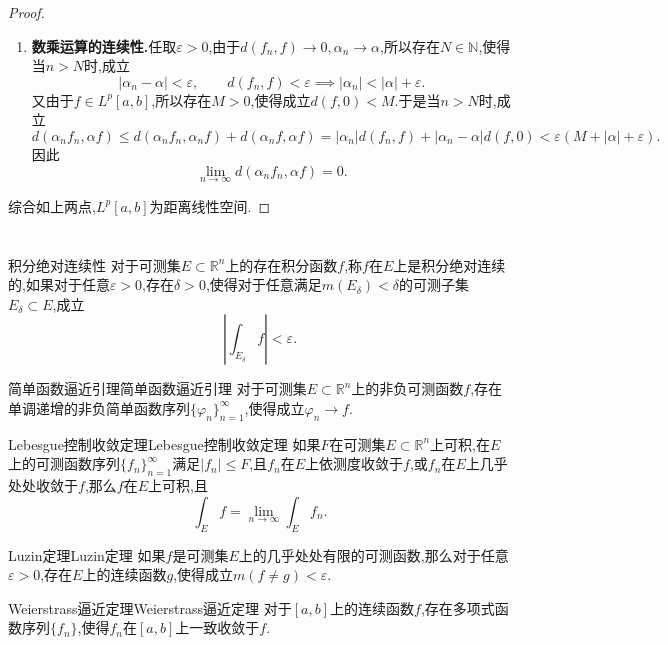 \documentclass[lang = cn, scheme = chinese]{elegantbook}
\newcommand{\R}{\mathbb{R}}            %
\begin{document}
\begin{proof}
\begin{enumerate}
			\item {\bf 数乘运算的连续性.}任取$\varepsilon>0$,由于$d(f_n,f)\to 0,\alpha_n\to \alpha$,所以存在$N\in\mathbb{N}$,使得当$n>N$时,成立
			$$
			|\alpha_n-\alpha|<\varepsilon,
			\qquad  d(f_n,f)<\varepsilon
			\implies |\alpha_n|<|\alpha|+\varepsilon.
			$$
			又由于$f\in L^p[a,b]$,所以存在$M>0$,使得成立$d(f,0)<M$.于是当$n>N$时,成立
			$$
			d(\alpha_n f_n,\alpha f)\le d(\alpha_nf_n,\alpha_n f)+d(\alpha_n f,\alpha f)=|\alpha_n|d(f_n,f)+|\alpha_n-\alpha|d(f,0)<\varepsilon(M+|\alpha|+\varepsilon).
			$$
			因此
			$$
			\lim_{n\to\infty}d(\alpha_n f_n,\alpha f)=0.
			$$
			
		\end{enumerate}
		
		综合如上两点,$L^p[a,b]$为距离线性空间.
	\end{proof}
	
	
	\chapter{}
	
	\begin{definition}{积分绝对连续性}
		对于可测集$E\subset\R^n$上的存在积分函数$f$,称$f$在$E$上是积分绝对连续的,如果对于任意$\varepsilon>0$,存在$\delta>0$,使得对于任意满足$m(E_\delta)<\delta$的可测子集$E_\delta\subset E$,成立
		$$
		\left| \int_{E_\delta}f \right|<\varepsilon.
		$$
	\end{definition}
	
	\begin{lemma}{简单函数逼近引理}{简单函数逼近引理}
		对于可测集$E\subset\R^n$上的非负可测函数$f$,存在单调递增的非负简单函数序列$\{ \varphi_n \}_{n=1}^{\infty}$,使得成立$\varphi_n\to f$.
	\end{lemma}
	
	\begin{lemma}{Lebesgue控制收敛定理}{Lebesgue控制收敛定理}
		如果$F$在可测集$E\subset\R^n$上可积,在$E$上的可测函数序列$\{ f_n \}_{n=1}^{\infty}$满足$|f_n|\le F$,且$f_n$在$E$上依测度收敛于$f$,或$f_n$在$E$上几乎处处收敛于$f$,那么$f$在$E$上可积,且
		$$
		\int_E f=\lim_{n\to\infty}\int_E f_n.
		$$
	\end{lemma}
	
	\begin{lemma}{Luzin定理}{Luzin定理}
		如果$f$是可测集$E$上的几乎处处有限的可测函数,那么对于任意$\varepsilon>0$,存在$E$上的连续函数$g$,使得成立$m(f\ne g)<\varepsilon$.
	\end{lemma}
	
	\begin{lemma}{Weierstrass逼近定理}{Weierstrass逼近定理}
		对于$[a,b]$上的连续函数$f$,存在多项式函数序列$\{f_n\}$,使得$f_n$在$[a,b]$上一致收敛于$f$.
	\end{lemma}
	
\end{document}
